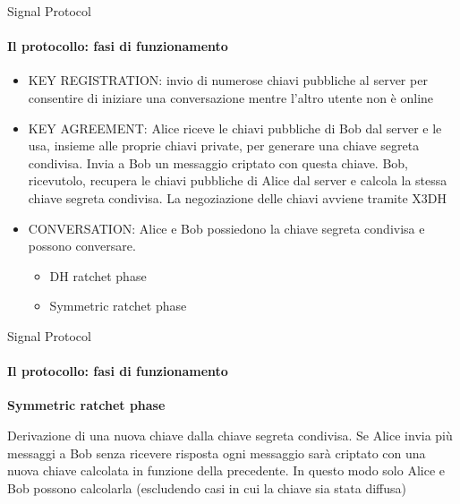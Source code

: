 \begin{frame}{Signal Protocol}
    \framesubtitle{Il protocollo: fasi di funzionamento \cite{VanDam}}
    \begin{itemize}
        \item KEY REGISTRATION: invio di numerose chiavi pubbliche al server per consentire di iniziare una conversazione mentre l'altro utente non è online\pause
        \item KEY AGREEMENT: Alice riceve le chiavi pubbliche di Bob dal server e le usa, insieme alle proprie chiavi private, per generare una chiave segreta condivisa. Invia a Bob un messaggio criptato con questa chiave. Bob, ricevutolo, recupera le chiavi pubbliche di Alice dal server e calcola la stessa chiave segreta condivisa. La negoziazione delle chiavi avviene tramite X3DH\pause
        \item CONVERSATION: Alice e Bob possiedono la chiave segreta condivisa e possono conversare.
                            \begin{itemize}
                                \item DH ratchet phase
                                \item Symmetric ratchet phase                                
                            \end{itemize}
    \end{itemize}

\end{frame}

\begin{frame}{Signal Protocol}
    \framesubtitle{Il protocollo: fasi di funzionamento}
    \textbf{Symmetric ratchet phase}\newline

    Derivazione di una nuova chiave dalla chiave segreta condivisa.\newline\pause
    Se Alice invia più messaggi a Bob senza ricevere risposta ogni messaggio sarà criptato con una nuova chiave calcolata in funzione della precedente.\newline\pause
    In questo modo solo Alice e Bob possono calcolarla (escludendo casi in cui la chiave sia stata diffusa)
    
\end{frame}

